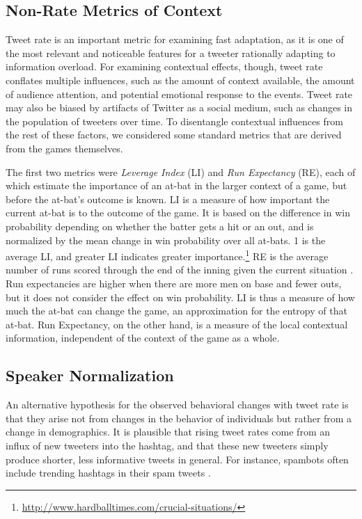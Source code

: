 \documentclass[11pt,letterpaper]{article}
\begin{document}
\subsection{Non-Rate Metrics of Context}\label{sect:other-metrics}
Tweet rate is an important metric for examining fast adaptation, as it is one of the most relevant and noticeable features for a tweeter rationally adapting to information overload. For examining contextual effects, though, tweet rate conflates multiple influences, such as the amount of context available, the amount of audience attention, and potential emotional response to the events.  Tweet rate may also be biased by artifacts of Twitter as a social medium, such as changes in the population of tweeters over time.  To disentangle contextual influences from the rest of these factors, we considered some standard metrics that are derived from the games themselves.

The first two metrics were {\it Leverage Index} (LI) and {\it Run Expectancy} (RE), each of which estimate the importance of an at-bat in the larger context of a game, but before the at-bat's outcome is known.  LI is a measure of how important the current at-bat is to the outcome of the game. It is based on the difference in win probability depending on whether the batter gets a hit or an out, and is normalized by the mean change in win probability over all at-bats. 1 is the average LI, and greater LI indicates greater importance.\footnote{\url{http://www.hardballtimes.com/crucial-situations/}}  RE is the average number of runs scored through the end of the inning given the current situation \cite{tango2007}. Run expectancies are higher when there are more men on base and fewer outs, but it does not consider the effect on win probability.  LI is thus a measure of how much the at-bat can change the game, an approximation for the entropy of that at-bat.  Run Expectancy, on the other hand, is a measure of the local contextual information, independent of the context of the game as a whole.

\subsection{Speaker Normalization}

An alternative hypothesis for the observed behavioral changes with tweet rate is that they arise not from changes in the behavior of individuals but rather from a change in demographics.  It is plausible that rising tweet rates come from an influx of new tweeters into the hashtag, and that these new tweeters simply produce shorter, less informative tweets in general.  For instance, spambots often include trending hashtags in their spam tweets \cite{martinez2013}.
\end{document}
